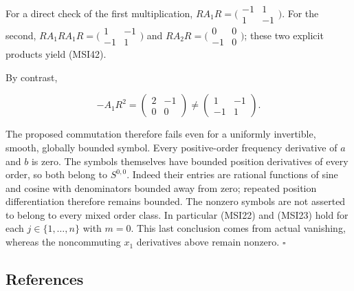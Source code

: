 \documentclass[
  11pt,
]{article}
\begin{document}
For a direct check of the first multiplication,
\(RA_1R=\bigl(\begin{smallmatrix}-1&1\\1&-1\end{smallmatrix}\bigr)\).
For the second,
\(RA_1RA_1R=\bigl(\begin{smallmatrix}1&-1\\-1&1\end{smallmatrix}\bigr)\)
and \(RA_2R=\bigl(\begin{smallmatrix}0&0\\-1&0\end{smallmatrix}\bigr)\);
these two explicit products yield (MSI42).

By contrast,

\[
-A_1R^2
=\begin{pmatrix}2&-1\\0&0\end{pmatrix}
\ne
\begin{pmatrix}1&-1\\-1&1\end{pmatrix}.
\tag{MSI43}
\]

The proposed commutation therefore fails even for a uniformly
invertible, smooth, globally bounded symbol. Every positive-order
frequency derivative of \(a\) and \(b\) is zero. The symbols themselves
have bounded position derivatives of every order, so both belong to
\(S^{0,0}\). Indeed their entries are rational functions of sine and
cosine with denominators bounded away from zero; repeated position
differentiation therefore remains bounded. The nonzero symbols are not
asserted to belong to every mixed order class. In particular (MSI22) and
(MSI23) hold for each \(j\in\{1,\ldots,n\}\) with \(m=0\). This last
conclusion comes from actual vanishing, whereas the noncommuting \(x_1\)
derivatives above remain nonzero. \(\square\)

\subsection{References}\label{references}
\end{document}
